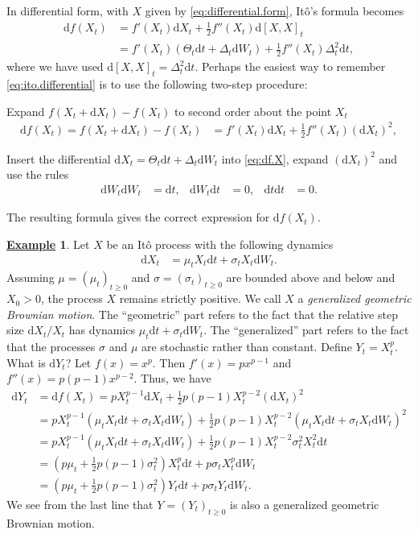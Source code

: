 \documentclass[12pt]{book}
\numberwithin{equation}{chapter}
\theoremstyle{plain}
\numberwithin{theorem}{section}
\theoremstyle{definition}
\newtheorem{example}[theorem]{\underline{Example}}
\numberwithin{exercise}{chapter}
\newcommand{\<}{\langle}
\renewcommand{\>}{\rangle}
\renewcommand{\(}{\left(}
\renewcommand{\)}{\right)}
\renewcommand{\[}{\left[}
\renewcommand{\]}{\right]}
\newcommand\sig{\sigma}
\newcommand\Del{\Delta}
\newcommand\dd{\mathrm{d}}
\begin{document}
\noindent
In differential form, with $X$ given by \eqref{eq:differential.form}, It\^o's formula becomes
\begin{align}
\dd f(X_t)
	&=	f'(X_t) \dd X_t + \tfrac{1}{2} f''(X_t) \dd [X,X]_t \\
	&=	f'(X_t) \( \Theta_t \dd t + \Delta_t \dd W_t \) + \tfrac{1}{2} f''(X_t) \Del_t^2 \dd t , \label{eq:ito.differential}
\end{align}
where we have used $\dd [X,X]_t = \Del_t^2 \dd t$.  Perhaps the easiest way to remember \eqref{eq:ito.differential} is to use the following two-step procedure:
\begin{enumerate*}
\item Expand $f(X_t + \dd X_t) - f(X_t)$ to second order about the point $X_t$
\begin{align}
\dd f(X_t) = f(X_t + \dd X_t) - f(X_t)
	&=	f'(X_t) \dd X_t + \tfrac{1}{2} f''(X_t) (\dd X_t)^2 , \label{eq:df.X}
\end{align}
\item Insert the differential $\dd X_t = \Theta_t \dd t + \Del_t \dd W_t$ into \eqref{eq:df.X}, expand $(\dd X_t)^2$ and use the rules
\begin{align}
\dd W_t \dd W_t
	&=	\dd t , &
\dd W_t \dd t
	&= 0 , &
\dd t \dd t
	&=	0 .
\end{align}
\end{enumerate*}
The resulting formula gives the correct expression for $\dd f(X_t)$.

\begin{example}
Let $X$ be an It\^o process with the following dynamics
\begin{align}
\dd X_t
	&=	\mu_t X_t \dd t + \sig_t X_t \dd W_t . \label{eq:GBM.general}
\end{align}
Assuming $\mu = (\mu_t)_{t \geq 0}$ and $\sig = (\sig_t)_{t \geq 0}$ are bounded above and below and $X_0>0$, the process $X$ remains strictly positive.
We call $X$ a \emph{generalized geometric Brownian motion}.  The ``geometric'' part refers to the fact that the relative step size $\dd X_t / X_t$ has dynamics $\mu_t \dd t + \sig_t \dd W_t$.  The ``generalized'' part refers to the fact that the processes $\sig$ and $\mu$ are stochastic rather than constant.
Define $Y_t = X_t^p$.  What is $\dd Y_t$?  Let $f(x) = x^p$.  Then $f'(x) = p x^{p-1}$ and $f''(x) = p(p-1)x^{p-2}$.  Thus, we have
\begin{align}
\dd Y_t
	&=	\dd f(X_t)
	=		p X_t^{p-1} \dd X_t + \tfrac{1}{2} p (p-1) X_t^{p-2} (\dd X_t)^2 \\
	&=	p X_t^{p-1} \( \mu_t X_t \dd t + \sig_t X_t \dd W_t \) + \tfrac{1}{2} p (p-1) X_t^{p-2} \( \mu_t X_t \dd t + \sig_t X_t \dd W_t \)^2 \\
	&=	p X_t^{p-1} \( \mu_t X_t \dd t + \sig_t X_t \dd W_t \) + \tfrac{1}{2} p (p-1) X_t^{p-2} \sig_t^2 X_t^2 \dd t  \\
	&=	\( p \mu_t + \tfrac{1}{2} p (p-1) \sig_t^2 \) X_t^p \dd t + p \sig_t X_t^p \dd W_t \\
	&=	\( p \mu_t + \tfrac{1}{2} p (p-1) \sig_t^2 \) Y_t \dd t + p \sig_t Y_t \dd W_t .
\end{align}
We see from the last line that $Y = (Y_t)_{t \geq 0}$ is also a generalized geometric Brownian motion.
\end{example}
\end{document}
